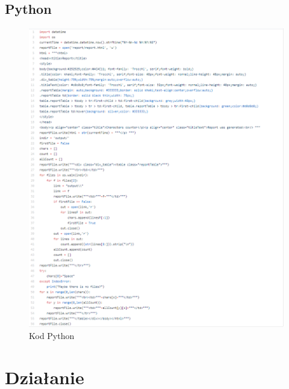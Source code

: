 \documentclass[]{article}
\begin{document}
\subsection{Python}
\begin{figure}[H]
	\centering
	\includegraphics[width=1\linewidth]{python_code}
	\caption{Kod Python}
	\label{fig:pythoncode}
\end{figure}
\section{Działanie}
\end{document}
